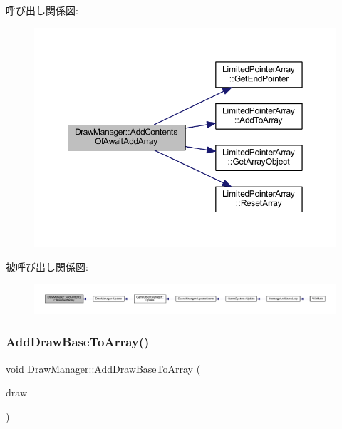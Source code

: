 呼び出し関係図\+:\nopagebreak
\begin{figure}[H]
\begin{center}
\leavevmode
\includegraphics[width=350pt]{class_draw_manager_a984cd9de288151fd1d170f80f93a11e8_cgraph}
\end{center}
\end{figure}
被呼び出し関係図\+:
\nopagebreak
\begin{figure}[H]
\begin{center}
\leavevmode
\includegraphics[width=350pt]{class_draw_manager_a984cd9de288151fd1d170f80f93a11e8_icgraph}
\end{center}
\end{figure}
\mbox{\label{class_draw_manager_a9dbd645fdbf927cd43d400335ff9b286}} 
\subsubsection{\texorpdfstring{Add\+Draw\+Base\+To\+Array()}{AddDrawBaseToArray()}}
{\footnotesize\ttfamily void Draw\+Manager\+::\+Add\+Draw\+Base\+To\+Array (\begin{DoxyParamCaption}\item[{\mbox{\hyperlink{class_draw_base}{Draw\+Base}} $\ast$}]{draw }\end{DoxyParamCaption})}



